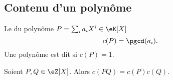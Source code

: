 \subsection{Contenu d'un polynôme}

\begin{definition}
    Le  du polynôme \( P=\sum_ia_iX^i\in\eK[X]\) 
    \begin{equation}
        c(P)=\pgcd(a_i).
    \end{equation}
    Une polynôme est dit  si \( c(P)=1\).
\end{definition}

\begin{lemma}   \label{LemHULrVaF}
    Soient \( P,Q\in \eZ[X]\). Alors \( c(PQ)=c(P)c(Q)\).
\end{lemma}


